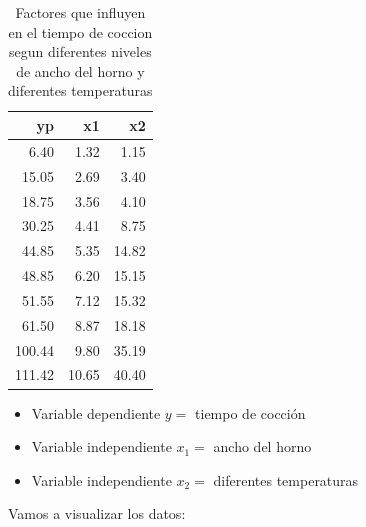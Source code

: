 \documentclass[
]{book}
\begin{document}
\begin{table}

\caption{\label{tab:unnamed-chunk-40}Factores que influyen en el tiempo de coccion segun diferentes niveles de ancho del horno y diferentes temperaturas}
\centering
\begin{tabular}[t]{r|r|r}
\hline
yp & x1 & x2\\
\hline
6.40 & 1.32 & 1.15\\
\hline
15.05 & 2.69 & 3.40\\
\hline
18.75 & 3.56 & 4.10\\
\hline
30.25 & 4.41 & 8.75\\
\hline
44.85 & 5.35 & 14.82\\
\hline
48.85 & 6.20 & 15.15\\
\hline
51.55 & 7.12 & 15.32\\
\hline
61.50 & 8.87 & 18.18\\
\hline
100.44 & 9.80 & 35.19\\
\hline
111.42 & 10.65 & 40.40\\
\hline
\end{tabular}
\end{table}

\begin{itemize}
\item
  Variable dependiente \(y =\) tiempo de cocción
\item
  Variable independiente \(x_1 =\) ancho del horno
\item
  Variable independiente \(x_2 =\) diferentes temperaturas
\end{itemize}

Vamos a visualizar los datos:
\end{document}
